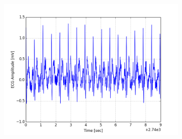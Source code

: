 \documentclass[paper=a4, fontsize=11pt]{scrartcl}
\numberwithin{equation}{section}		%
\numberwithin{figure}{section}			%
\numberwithin{table}{section}		    %
\begin{document}
\begin{appendices}
\begin{figure}[H]
\begin{subfigure}[b]{0.3\textwidth}
		\includegraphics[width=\textwidth]{sim/ecg_45}
	\end{subfigure}
\end{figure}


\end{appendices}
\end{document}
